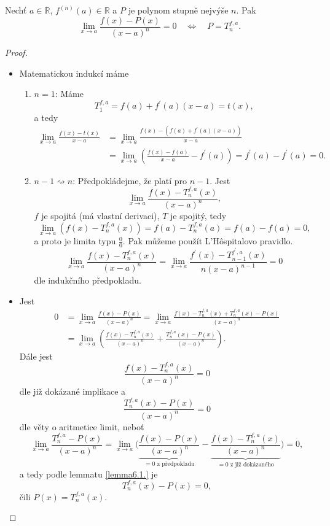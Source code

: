 \begin{veta}\label{veta6.2}
Nechť $a \in \mathbb{R}$, $f^{(n)}(a) \in \mathbb{R}$ a $P$ je polynom stupně nejvýše $n$. Pak
\[
\lim_{x \to a} \frac{f(x) - P(x)}{(x-a)^n} = 0
\quad \Longleftrightarrow \quad
P = T^{f,a}_n.
\]
\end{veta}

\begin{proof}\,
\begin{itemize}
	\item[$\impliedby$] Matematickou indukcí máme
	\begin{enumerate}
		\item $n=1$: Máme
		$$
		    T_1^{f,a}=f(a)+f^\prime(a)(x-a)=t(x),
		$$
		a tedy
		\begin{align*}
		\lim_{x\to a} \frac{f(x)-t(x)}{x-a}&=\lim_{x\to a}\frac{f(x)-(f(a)+f^\prime(a)(x-a))}{x-a}\\
		&=\lim_{x\to a} \left( \frac{f(x)-f(a)}{x-a}-f^\prime(a) \right ) = f^\prime(a)-f^\prime(a)=0.
		\end{align*}
		\item $n-1\rightsquigarrow n$: Předpokládejme, že platí pro $n-1$. Jest
		$$
		    \lim_{x\to a} \frac{f(x)-T^{f,a}_n(x)}{(x-a)^n},
		$$
		$f$ je spojitá (má vlastní derivaci), $T$ je spojitý, tedy
	 $$ \lim_{x\to a}\left( f(x)-T_n^{f,a}(x) \right ) = f(a)-T_n^{f,a}(a)=f(a)-f(a)=0,$$
		a proto je limita typu $\frac{0}{0}$. Pak můžeme použít L'H\^{o}spitalovo pravidlo.
		$$
		\lim_{x\to a} \frac{f(x)-T_n^{f,a}(x)}{(x-a)^n}=\lim_{x\to a} \frac{f^\prime(x)-T_{n-1}^{f^\prime,a}(x)}{n(x-a)^{n-1}}=0
		$$
		dle indukčního předpokladu.
	\end{enumerate}
	\item[$\implies$] Jest
	\begin{align*}
	0&=\lim_{x\to a} \frac{f(x)-P(x)}{(x-a)^n}=\lim_{x\to a} \frac{f(x)-T_n^{f,a}(x)+T_n^{f,a}(x)-P(x)}{(x-a)^n}\\
	&= \lim_{x\to a} \left( \frac{f(x)-T_n^{f,a}(x)}{(x-a)^n}+\frac{T_n^{f,a}(x)-P(x)}{(x-a)^n} \right ) .
	\end{align*}
	Dále jest
	$$
	\frac{f(x)-T_n^{f,a}(x)}{(x-a)^n} = 0
	$$
	dle již dokázané implikace a
	$$
	    \frac{T_n^{f,a}(x)-P(x)}{(x-a)^n} = 0
	$$
	dle věty o aritmetice limit, neboť
	$$\lim_{x\to a}\frac{T_n^{f,a}-P(x)}{(x-a)^n} = \lim_{x\to a} \bigg( \underbrace{\frac{f(x)-P(x)}{(x-a)^n}}_{=0\textrm{ z předpokladu}}-\underbrace{\frac{f(x)-T_n^{f,a}(x)}{(x-a)^n}}_{=0\textrm{ z již dokázaného}} \bigg)=0 ,$$
	a tedy podle lemmatu \ref{lemma6.1.} je
	$$
	T_n^{f,a}(x)-P(x)=0,
	$$
	čili $P(x)=T_n^{f,a}(x)$.\qedhere
\end{itemize}
\end{proof}

